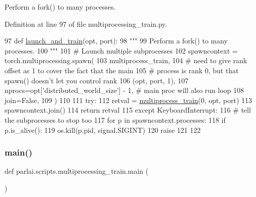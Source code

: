 \begin{DoxyVerb}Perform a fork() to many processes.
\end{DoxyVerb}
 

Definition at line 97 of file multiprocessing\+\_\+train.\+py.


\begin{DoxyCode}
97 \textcolor{keyword}{def }\hyperlink{namespaceparlai_1_1scripts_1_1multiprocessing__train_a5dc8df166f1c025b54f7420a1ab2f812}{launch\_and\_train}(opt, port):
98     \textcolor{stringliteral}{"""}
99 \textcolor{stringliteral}{    Perform a fork() to many processes.}
100 \textcolor{stringliteral}{    """}
101     \textcolor{comment}{# Launch multiple subprocesses}
102     spawncontext = torch.multiprocessing.spawn(
103         multiprocess\_train,
104         \textcolor{comment}{# need to give rank offset as 1 to cover the fact that the main}
105         \textcolor{comment}{# process is rank 0, but that spawn() doesn't let you control rank}
106         (opt, port, 1),
107         nprocs=opt[\textcolor{stringliteral}{'distributed\_world\_size'}] - 1,  \textcolor{comment}{# main proc will also run loop}
108         join=\textcolor{keyword}{False},
109     )
110 
111     \textcolor{keywordflow}{try}:
112         retval = \hyperlink{namespaceparlai_1_1scripts_1_1multiprocessing__train_aa979267c9eb44bbdfcd25a6d69a58cc4}{multiprocess\_train}(0, opt, port)
113         spawncontext.join()
114         \textcolor{keywordflow}{return} retval
115     \textcolor{keywordflow}{except} KeyboardInterrupt:
116         \textcolor{comment}{# tell the subprocesses to stop too}
117         \textcolor{keywordflow}{for} p \textcolor{keywordflow}{in} spawncontext.processes:
118             \textcolor{keywordflow}{if} p.is\_alive():
119                 os.kill(p.pid, signal.SIGINT)
120         \textcolor{keywordflow}{raise}
121 
122 
\end{DoxyCode}
\mbox{\label{namespaceparlai_1_1scripts_1_1multiprocessing__train_aa7b2a133561ac5212f3ee9814a645522}} 
\subsubsection{\texorpdfstring{main()}{main()}}
{\footnotesize\ttfamily def parlai.\+scripts.\+multiprocessing\+\_\+train.\+main (\begin{DoxyParamCaption}{ }\end{DoxyParamCaption})}



